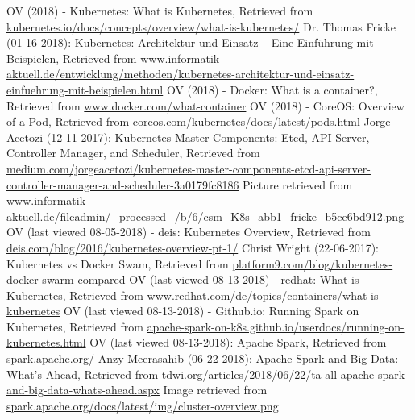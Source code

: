 \begin{thebibliography}{..........}
   	OV (2018) - Kubernetes:
   				What is Kubernetes,
   				Retrieved from \url{kubernetes.io/docs/concepts/overview/what-is-kubernetes/}
   	Dr. Thomas Fricke (01-16-2018):
                              	Kubernetes: Architektur und Einsatz – Eine Einführung mit Beispielen,
                              	Retrieved from \url{www.informatik-aktuell.de/entwicklung/methoden/kubernetes-architektur-und-einsatz-einfuehrung-mit-beispielen.html}
   	OV (2018) - Docker:
                              	What is a container?,
                              	Retrieved from \url{www.docker.com/what-container}
   	OV (2018) - CoreOS:
                              	Overview of a Pod,
                              	Retrieved from \url{coreos.com/kubernetes/docs/latest/pods.html}
   	Jorge Acetozi (12-11-2017):
                              	Kubernetes Master Components: Etcd, API Server, Controller Manager, and Scheduler,
                              	Retrieved from \href{medium.com/jorgeacetozi/kubernetes-master-components-etcd-api-server-controller-manager-and-scheduler-3a0179fc8186}{medium.com/jorgeacetozi/kubernetes-master-components-etcd-api-server-controller-manager-and-scheduler-3a0179fc8186}
   	Picture retrieved from \url{www.informatik-aktuell.de/fileadmin/_processed_/b/6/csm_K8s_abb1_fricke_b5ce6bd912.png}
   	OV (last viewed 08-05-2018) - deis:
                              	Kubernetes Overview,
                              	Retrieved from \url{deis.com/blog/2016/kubernetes-overview-pt-1/}
   	Christ Wright (22-06-2017):
                              	Kubernetes vs Docker Swam,
                              	Retrieved from \url{platform9.com/blog/kubernetes-docker-swarm-compared}
   	OV (last viewed 08-13-2018) - redhat:
   				What is Kubernetes,
   				Retrieved from \url{www.redhat.com/de/topics/containers/what-is-kubernetes}
   	OV (last viewed 08-13-2018) - Github.io:
                              	Running Spark on Kubernetes,
                              	Retrieved from \url{apache-spark-on-k8s.github.io/userdocs/running-on-kubernetes.html}          
   	OV (last viewed 08-13-2018):
   				Apache Spark,
   				Retrieved from \url{spark.apache.org/}
   	Anzy Meerasahib (06-22-2018):
   				Apache Spark and Big Data: What's Ahead,
                              	Retrieved from \url{tdwi.org/articles/2018/06/22/ta-all-apache-spark-and-big-data-whats-ahead.aspx}
   	Image retrieved from \url{spark.apache.org/docs/latest/img/cluster-overview.png}

\end{thebibliography}
